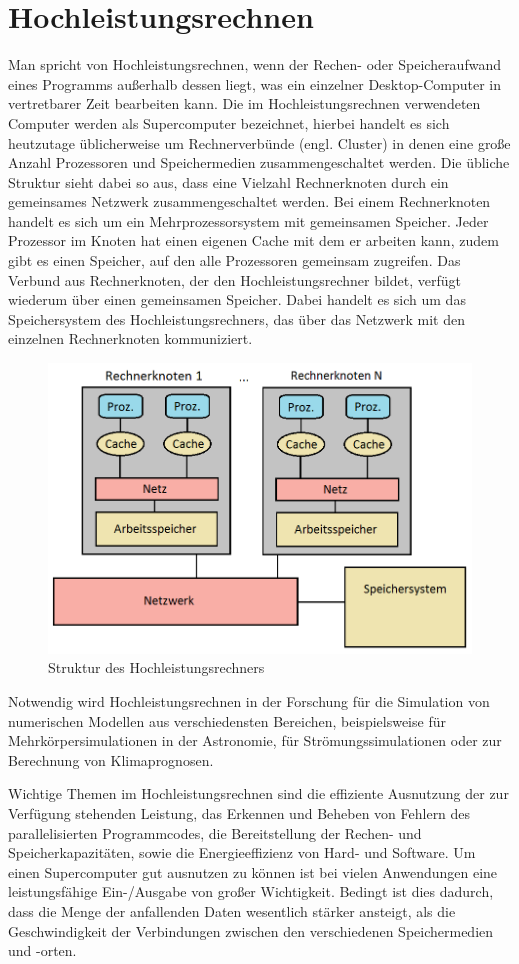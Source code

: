 \documentclass[
	12pt,
	a4paper,
	BCOR10mm,
	DIV14,
	listof=totoc,
	bibliography=totoc,
	headsepline
]{scrreprt}
\begin{document}
\section{Hochleistungsrechnen}
\label{back_hpc}
Man spricht von Hochleistungsrechnen, wenn der Rechen- oder Speicheraufwand eines Programms außerhalb dessen liegt, was ein einzelner Desktop-Computer in vertretbarer Zeit bearbeiten kann.
Die im Hochleistungsrechnen verwendeten Computer werden als Supercomputer bezeichnet, hierbei handelt es sich heutzutage üblicherweise um Rechnerverbünde (engl. Cluster) in denen eine große Anzahl Prozessoren und Speichermedien zusammengeschaltet werden.
Die übliche Struktur sieht dabei so aus, dass eine Vielzahl Rechnerknoten durch ein gemeinsames Netzwerk zusammengeschaltet werden. Bei einem Rechnerknoten handelt es sich um ein Mehrprozessorsystem mit gemeinsamen Speicher. Jeder Prozessor im Knoten hat einen eigenen Cache mit dem er arbeiten kann, zudem gibt es einen Speicher, auf den alle Prozessoren gemeinsam zugreifen. 
Das Verbund aus Rechnerknoten, der den Hochleistungsrechner bildet, verfügt wiederum über einen gemeinsamen Speicher. Dabei handelt es sich um das Speichersystem des Hochleistungsrechners, das über das Netzwerk mit den einzelnen Rechnerknoten kommuniziert.
\begin{figure}[h]
	\begin{center}
		\includegraphics[width=.43\textwidth]{Bilder/rechnerknoten.png}
	\end{center}
	\caption{Struktur des Hochleistungsrechners}
	\label{fig:rechnerknoten}
\end{figure}

Notwendig wird Hochleistungsrechnen in der Forschung für die Simulation von numerischen Modellen aus verschiedensten Bereichen, beispielsweise für Mehrkörpersimulationen in der Astronomie, für Strömungssimulationen oder zur Berechnung von Klimaprognosen.
\medskip

Wichtige Themen im Hochleistungsrechnen sind die effiziente Ausnutzung der zur Verfügung stehenden Leistung, das Erkennen und Beheben von Fehlern des parallelisierten Programmcodes, die Bereitstellung der Rechen- und Speicherkapazitäten, sowie die Energieeffizienz von Hard- und Software.
Um einen Supercomputer gut ausnutzen zu können ist bei vielen Anwendungen eine leistungsfähige Ein-/Ausgabe von großer Wichtigkeit. Bedingt ist dies dadurch, dass die Menge der anfallenden Daten wesentlich stärker ansteigt, als die Geschwindigkeit der Verbindungen zwischen den verschiedenen Speichermedien und -orten.
\end{document}
